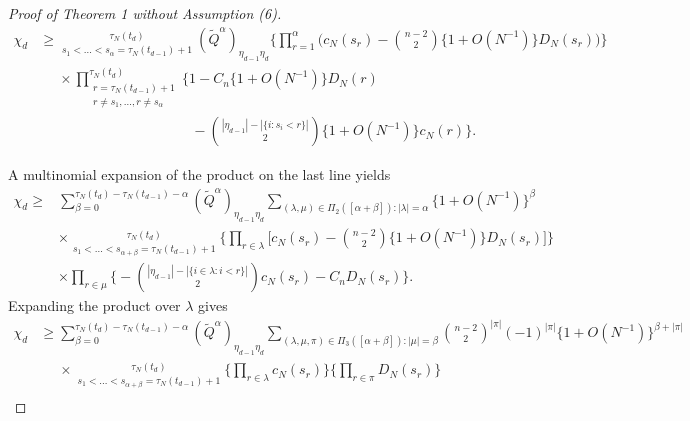 \documentclass[a4paper,11pt]{article}
\theoremstyle{definition}
\newcommand{\1}{\mathds{1}}
\newcommand{\osum}{\mathop{\sum\nolimits^{\phantom{}_{\star}}}\limits}
\begin{document}
\begin{proof}[Proof of Theorem 1 without Assumption (6)]
\begin{align*}
\chi_d &\geq \osum_{ s_1 < \ldots < s_{ \alpha } = \tau_N( t_{ d - 1 } ) + 1 }^{ \tau_N( t_d ) } ( \tilde{ Q }^{ \alpha } )_{ \eta_{ d - 1 } \eta_d } \Bigg\{ \prod_{ r = 1 }^{ \alpha } \Bigg( c_N( s_r ) - \binom{ n - 2 }{ 2 } \{ 1+ O( N^{ -1 } ) \} D_N( s_r ) \Bigg) \Bigg\} \\
&\phantom{\geq} \times \prod_{ \substack{ r = \tau_N( t_{ d - 1 } ) + 1 \\ r \neq s_1, \ldots, r \neq s_{ \alpha } } }^{ \tau_N( t_d ) } \Bigg\{ 1 - C_n \{ 1 + O( N^{ -1 } ) \} D_N( r ) \\
&\phantom{ \geq \times \prod_{ \substack{ r = \tau_N( t_{ d - 1 } ) + 1 \\ r \neq s_1, \ldots, r \neq s_{ \alpha } } }^{ \tau_N( t_d ) } \Bigg\{ 1 } - \binom{ | \eta_{ d - 1 } | - | \{ i : s_i < r \} | }{ 2 } \{ 1 + O( N^{ -1 } ) \} c_N( r ) \Bigg\}.
\end{align*}
A multinomial expansion of the product on the last line yields 
\begin{align*}
\chi_d \geq {}& \sum_{ \beta = 0 }^{ \tau_N( t_d ) - \tau_N( t_{ d - 1 } ) - \alpha } ( \tilde{ Q }^{ \alpha } )_{ \eta_{ d - 1 } \eta_d } \sum_{ ( \lambda, \mu ) \in \Pi_2( [ \alpha + \beta ] ) : | \lambda | = \alpha } \{ 1 + O( N^{ -1 } ) \}^{ \beta } \\
&\times \osum_{ s_1 < \ldots < s_{ \alpha + \beta } = \tau_N( t_{ d - 1 } ) + 1 }^{ \tau_N( t_d ) } \Bigg\{ \prod_{ r \in \lambda } \Bigg[ c_N( s_r ) - \binom{ n - 2 }{ 2 } \{ 1 + O( N^{ -1 } ) \} D_N( s_r ) \Bigg] \Bigg\}\\
&\times \prod_{ r \in \mu } \Bigg\{ - \binom{ | \eta_{ d - 1 } | - | \{ i \in \lambda : i < r \} | }{ 2 } c_N( s_r ) - C_n D_N( s_r ) \Bigg\}.
\end{align*}
Expanding the product over $\lambda$ gives
\begin{align*}
\chi_d &\geq \sum_{ \beta = 0 }^{ \tau_N( t_d ) - \tau_N( t_{ d - 1 } ) - \alpha } ( \tilde{ Q }^{ \alpha } )_{ \eta_{ d - 1 } \eta_d } \sum_{ ( \lambda, \mu, \pi ) \in \Pi_3( [ \alpha + \beta ] ) : | \mu | = \beta } \binom{ n - 2 }{ 2 }^{ | \pi | } ( -1 )^{ | \pi | } \{ 1 + O( N^{ -1 } ) \}^{ \beta + | \pi | } \\
&\phantom{\geq} \times \osum_{ s_1 < \ldots < s_{ \alpha + \beta } = \tau_N( t_{ d - 1 } ) + 1 }^{ \tau_N( t_d ) } \Bigg\{ \prod_{ r \in \lambda } c_N( s_r ) \Bigg\} \Bigg\{ \prod_{ r \in \pi }  D_N( s_r ) \Bigg\} \\

\end{align*}
\end{proof}
\end{document}

